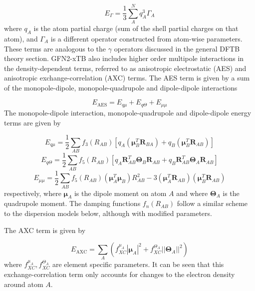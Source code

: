 \begin{equation}
E_\Gamma = \frac{1}{3}\sum_A^N q_A^3 \Gamma_A
\end{equation}
%
where $q_A$ is the atom partial charge (sum of the shell partial charges on that atom), 
and $\Gamma_A$ is a different operator constructed from atom-wise parameters. These
terms are analogous to the $\gamma$ operators discussed in the general DFTB theory
section. GFN2-xTB also includes higher order multipole interactions in the density-dependent
terms, referred to as anisotropic electrostatic (AES) and anisotropic exchange-correlation
(AXC) terms. The AES term is given by a sum of the monopole-dipole, monopole-quadrupole
and dipole-dipole interactions

\begin{equation}
    E_{\text{AES}} = E_{q\mu} + E_{q \Theta} + E_{\mu\mu}
\end{equation}
%
The monopole-dipole interaction, monopole-quadrupole and dipole-dipole energy terms 
are given by

\begin{equation}
    E_{q\mu} = \frac{1}{2} \sum_{AB} f_3\left(R_{AB}\right) \left[ q_A \left(\mathbf{\mu}_B^T \mathbf{R}_{BA}\right) + q_B \left(\mathbf{\mu}_B^T \mathbf{R}_{AB}\right)\right]
\end{equation}
%
\begin{equation}
    E_{q \Theta} = \frac{1}{2} \sum_{AB} f_5\left(R_{AB}\right) \left[ q_A \mathbf{R}^T_{AB} \mathbf{\Theta}_B \mathbf{R}_{AB} + q_B \mathbf{R}^T_{AB} \mathbf{\Theta}_A \mathbf{R}_{AB} \right]
\end{equation}
%
\begin{equation}
    E_{\mu\mu} = \frac{1}{2} \sum_{AB} f_5\left(R_{AB}\right) \left( \mathbf{\mu}_A^T \mathbf{\mu}_B \right) R_{AB}^2 - 3 \left( \mathbf{\mu}_A^T \mathbf{R}_{AB} \right) \left( \mathbf{\mu}_B^T \mathbf{R}_{AB} \right) 
\end{equation}
%
respectively, where  $\mathbf{\mu}_A$ is the dipole moment on atom $A$ and where 
$\mathbf{\Theta}_A$ is the quadrupole moment. The damping functions $f_n \left(R_{AB}\right)$
follow a similar scheme to the dispersion models below, although with modified parameters.

The AXC term is given by 

\begin{equation}
    E_{\text{AXC}} = \sum_A \left( f_{XC}^{\mu_A} \left\lvert \mathbf{\mu}_A\right\rvert^2  + f_{XC}^{\Theta_A} \left\lvert \left\lvert \mathbf{\Theta}_A \right\rvert\right\rvert^2\right)
\end{equation}
%
where $f_{XC}^{\mu_A}, f_{XC}^{\Theta_A}$ are element specific parameters. It can
be seen that this exchange-correlation term only accounts for changes to the electron
density around atom $A$.

